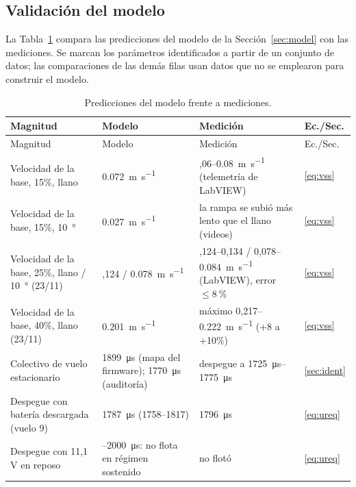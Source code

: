 \subsection{Validación del modelo}
\label{sec:modelval}
La Tabla~\ref{tab:modelval} compara las predicciones del modelo de la Sección~\ref{sec:model} con las mediciones. Se marcan los parámetros identificados a partir de un conjunto de datos; las comparaciones de las demás filas usan datos que no se emplearon para construir el modelo.

\begin{small}
\setlength{\tabcolsep}{4pt}
\begin{longtable}{@{}>{\raggedright\arraybackslash}p{}>{\raggedright\arraybackslash}p{}>{\raggedright\arraybackslash}p{}>{\raggedright\arraybackslash}p{}@{}}
\caption{Predicciones del modelo frente a mediciones.}\label{tab:modelval}\\
\toprule
Magnitud & Modelo & Medición & Ec./Sec. \\
\midrule\endfirsthead
\toprule Magnitud & Modelo & Medición & Ec./Sec. \\ \midrule\endhead
Velocidad de la base, 15\%, llano & \SI{0.072}{\metre\per\second} & 0,06--\SI{0.08}{\metre\per\second} (telemetría de LabVIEW) & \eqref{eq:vss} \\
Velocidad de la base, 15\%, \SI{10}{\degree} & \SI{0.027}{\metre\per\second} & la rampa se subió más lento que el llano (videos) & \eqref{eq:vss} \\
Velocidad de la base, 25\%, llano / \SI{10}{\degree} (23/11) & 0,124 / \SI{0.078}{\metre\per\second} & 0,124--0,134 / 0,078--\SI{0.084}{\metre\per\second} (LabVIEW), error $\le\SI{8}{\percent}$ & \eqref{eq:vss} \\
Velocidad de la base, 40\%, llano (23/11) & \SI{0.201}{\metre\per\second} & máximo 0,217--\SI{0.222}{\metre\per\second} (+8 a +10\%) & \eqref{eq:vss} \\
Colectivo de vuelo estacionario & \SI{1899}{\micro\second} (mapa del firmware); \SI{1770}{\micro\second} (auditoría) & despegue a \SIrange{1725}{1775}{\micro\second} & \ref{sec:ident} \\
Despegue con batería descargada (vuelo 9) & \SI{1787}{\micro\second} (1758--1817) & \SI{1796}{\micro\second} & \eqref{eq:ureq} \\
Despegue con 11,1\,V en reposo & 1850--\SI{2000}{\micro\second}: no flota en régimen sostenido & no flotó & \eqref{eq:ureq} \\

\end{longtable}
\end{small}
